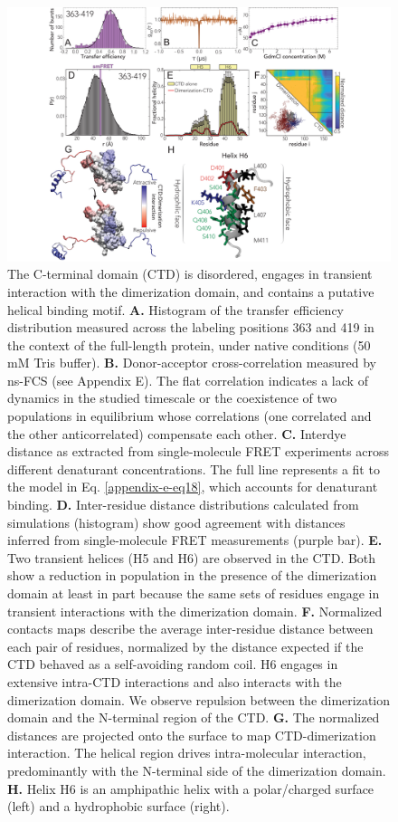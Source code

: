 \documentclass[../main.tex]{subfiles}
\begin{document}
        \begin{figure}[!htb] %
            \centering
            \includegraphics[width=5.5in]{ch6-fig4.png}
            \caption[The C-terminal domain (CTD) is disordered, engages in transient interaction with the dimerization domain, and contains a putative helical binding motif.]
                {The C-terminal domain (CTD) is disordered, engages in transient interaction with the dimerization domain, and contains a putative helical binding motif. \textbf{A.} Histogram of the transfer efficiency distribution measured across the labeling positions 363 and 419 in the context of the full-length protein, under native conditions (50 mM Tris buffer). \textbf{B.} Donor-acceptor cross-correlation measured by ns-FCS (see Appendix E). The flat correlation indicates a lack of dynamics in the studied timescale or the coexistence of two populations in equilibrium whose correlations (one correlated and the other anticorrelated) compensate each other. \textbf{C.} Interdye distance as extracted from single-molecule FRET experiments across different denaturant concentrations. The full line represents a fit to the model in Eq. \ref{appendix-e-eq18}, which accounts for denaturant binding. \textbf{D.} Inter-residue distance distributions calculated from simulations (histogram) show good agreement with distances inferred from single-molecule FRET measurements (purple bar). \textbf{E.} Two transient helices (H5 and H6) are observed in the CTD. Both show a reduction in population in the presence of the dimerization domain at least in part because the same sets of residues engage in transient interactions with the dimerization domain. \textbf{F.} Normalized contacts maps describe the average inter-residue distance between each pair of residues, normalized by the distance expected if the CTD behaved as a self-avoiding random coil. H6 engages in extensive intra-CTD interactions and also interacts with the dimerization domain. We observe repulsion between the dimerization domain and the N-terminal region of the CTD. \textbf{G.} The normalized distances are projected onto the surface to map CTD-dimerization interaction. The helical region drives intra-molecular interaction, predominantly with the N-terminal side of the dimerization domain. \textbf{H.} Helix H6 is an amphipathic helix with a polar/charged surface (left) and a hydrophobic surface (right).}

\end{figure}
\end{document}
